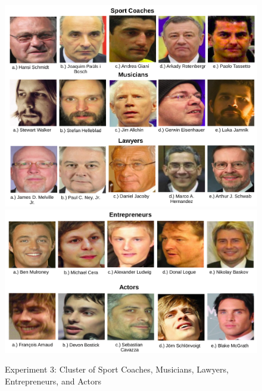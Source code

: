 \documentclass[12pt,english]{article}
\begin{document}
\begin{figure}[H]
 \centering
    \includegraphics[width=\columnwidth]{figures/lawyers.png}
    \includegraphics[width=\columnwidth]{figures/actor.png}
    \caption{Experiment 3: Cluster of Sport Coaches, Musicians, Lawyers, Entrepreneurs, and Actors}
    \label{fig:ex2tp}
\end{figure}
\end{document}
